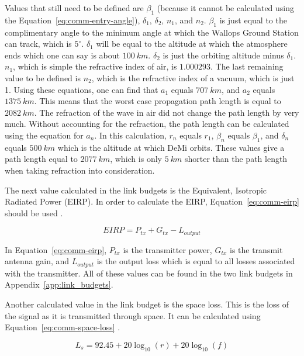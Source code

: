 \documentclass[12pt]{article}
\begin{document}
Values that still need to be defined are $\beta_1$ (because it cannot be calculated using the Equation~\ref{eq:comm-entry-angle}), $\delta_1$, $\delta_2$, $n_1$, and $n_2$. $\beta_1$ is just equal to the complimentary angle to the minimum angle at which the Wallops Ground Station can track, which is $5^\circ$. $\delta_1$ will be equal to the altitude at which the atmosphere ends which one can say is about $100\ km$. $\delta_2$ is just the orbiting altitude minus $\delta_1$. $n_1$, which is simple the refractive index of air, is $1.000293$. The last remaining value to be defined is $n_2$, which is the refractive index of a vacuum, which is just 1. Using these equations, one can find that $a_1$ equals $707\ km$, and $a_2$ equals $1375\ km$. This means that the worst case propagation path length is equal to $2082\ km$. The refraction of the wave in air did not change the path length by very much. Without accounting for the refraction, the path length can be calculated using the equation for $a_n$. In this calculation, $r_n$ equals $r_1$, $\beta_n$ equals $\beta_1$, and $\delta_n$ equals $500\ km$ which is the altitude at which DeMi orbits. These values give a path length equal to $2077\ km$, which is only $5\ km$ shorter than the path length when taking refraction into consideration.

The next value calculated in the link budgets is the Equivalent, Isotropic Radiated Power (EIRP). In order to calculate the EIRP, Equation~\ref{eq:comm-eirp} should be used \cite[p.~476]{SMAD}.

\begin{equation}\label{eq:comm-eirp}
EIRP = P_{tx} + G_{tx} - L_{output} 
\end{equation}

In Equation~\ref{eq:comm-eirp}, $P_{tx}$ is the transmitter power, $G_{tx}$ is the transmit antenna gain, and $L_{output}$ is the output loss which is equal to all losses associated with the transmitter. All of these values can be found in the two link budgets in Appendix~\ref{app:link_budgets}.

Another calculated value in the link budget is the space loss. This is the loss of the signal as it is transmitted through space. It can be calculated using Equation~\ref{eq:comm-space-loss} \cite[p.~476]{SMAD}.

\begin{equation}\label{eq:comm-space-loss}
L_s = 92.45 + 20\log_{10}(r) + 20\log_{10}(f) 
\end{equation}
\end{document}
